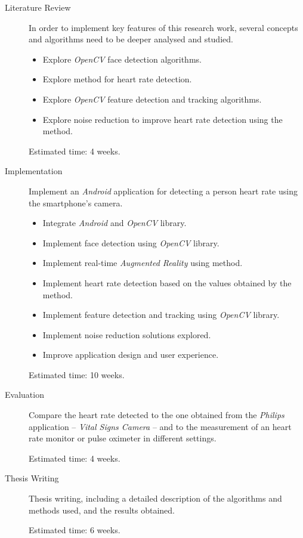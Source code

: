 \begin{description}

\item[Literature Review] \hfill

In order to implement key features of this research work, several
concepts and algorithms need to be deeper analysed and studied.

\begin{itemize}
  \item Explore \emph{OpenCV} face detection algorithms.
  \item Explore \evm{} method for heart rate detection.
  \item Explore \emph{OpenCV} feature detection and tracking algorithms.
  \item Explore noise reduction to improve heart rate detection
        using the \evm{} method.
\end{itemize}

Estimated time: 4 weeks.

\pagebreak

\item[Implementation] \hfill

Implement an \emph{Android} application for detecting a person
heart rate using the smartphone's camera.

\begin{itemize}
  \item Integrate \emph{Android} and \emph{OpenCV} library.
  \item Implement face detection using \emph{OpenCV} library.
  \item Implement real-time \emph{Augmented Reality} using
        \evm{} method.
  \item Implement heart rate detection based on the values
        obtained by the \evm{} method.
  \item Implement feature detection and tracking using \emph{OpenCV} library.
  \item Implement noise reduction solutions explored.
  \item Improve application design and user experience.
\end{itemize}

Estimated time: 10 weeks.

\item[Evaluation] \hfill

Compare the heart rate detected to the one obtained from the
\emph{Philips}~\cite{Philips2013} application -- \emph{Vital Signs
Camera} -- and to the measurement of an heart rate monitor or pulse
oximeter in different settings.

Estimated time: 4 weeks.

\item[Thesis Writing] \hfill

Thesis writing, including a detailed description of the algorithms
and methods used, and the results obtained.

Estimated time: 6 weeks.

\end{description}

